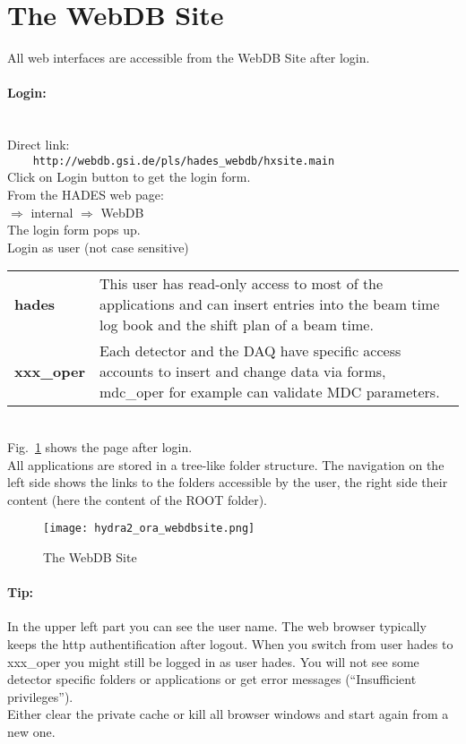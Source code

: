 \section[The WebDB Site]{The WebDB Site} \label{sec:oraWebdbSite}

All web interfaces are accessible from the WebDB Site after login.
\paragraph{Login:} ~\\
Direct link:\\
\verb+    http://webdb.gsi.de/pls/hades_webdb/hxsite.main+\\
Click on Login button to get the login form.\\

From the HADES web page:\\
 $\Rightarrow$ internal $\Rightarrow$ WebDB\\
The login form pops up.\\

Login as user (not case sensitive)\\
\begin{tabular}{l p{14cm}}
\textbf{hades}     & This user has read-only access to most of the applications and can insert entries into the 
                   beam time log book and the shift plan of a beam time. \\
\textbf{xxx\_oper} & Each detector and the DAQ have specific access accounts to insert and change data via forms, 
                   mdc\_oper for example can validate MDC parameters. \\
\end{tabular}\\

Fig.~\ref{fig:oraWebdbSite} shows the page after login.\\
All applications are stored in a tree-like folder structure. The navigation on the left side shows the links to the folders 
accessible by the user, the right side their content (here the content of the ROOT folder).

\begin{figure}[\htb]
  \centering
  \texttt{[image: hydra2\_ora\_webdbsite.png]}
  \caption[The WebDB Site]{The WebDB Site}
  \label{fig:oraWebdbSite}
\end{figure}

\paragraph{Tip:} In the upper left part you can see the user name. The web browser typically keeps the http authentification 
after logout. When you switch from user hades to xxx\_oper you might still be logged in as user hades. You will not 
see some detector specific folders or applications or get error messages (``Insufficient privileges'').\\
Either clear the private cache or kill all browser windows and start again from a new one.  

